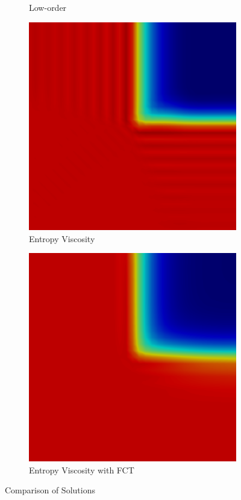\begin{figure}[h]
\begin{subfigure}{0.3\textwidth}
      \caption{Low-order}
   \end{subfigure}
   \begin{subfigure}{0.3\textwidth}
      \includegraphics[width=\textwidth]{skew_void_to_absorber/EV.png}
      \caption{Entropy Viscosity}
   \end{subfigure}
   \begin{subfigure}{0.3\textwidth}
      \includegraphics[width=\textwidth]{skew_void_to_absorber/EVFCT.png}
      \caption{Entropy Viscosity with FCT}
   \end{subfigure}
   \caption{Comparison of Solutions}
\end{figure}

